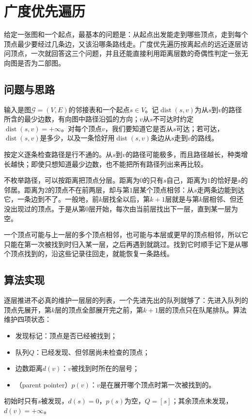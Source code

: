 \section{广度优先遍历}
\label{sec:graph-bfs}

给定一张图和一个起点，最基本的问题是：从起点出发能走到哪些顶点，走到每个顶点最少要经过几条边，又该沿哪条路线走。广度优先遍历按离起点的远近逐层访问顶点，一次就回答这三个问题，并且还能直接利用距离层数的奇偶性判定一张无向图是否为二部图。

\subsection{问题与思路}
\label{sec:graph-trav-bfs-problem}

输入是图$\mathcal G=(V,E)$的邻接表和一个起点$s\in V$。记$\operatorname{dist}(s,v)$为从$s$到$v$的路径所含的最少边数，有向图中路径沿弧的方向；$v$从$s$不可达时约定$\operatorname{dist}(s,v)=+\infty$。对每个顶点$v$，我们要知道它是否从$s$可达；若可达，$\operatorname{dist}(s,v)$是多少，以及一条恰好用$\operatorname{dist}(s,v)$条边从$s$走到$v$的路线。

按定义逐条检查路径是行不通的。从$s$到$v$的路径可能极多，而且路径越长，种类增长越快；即使只想知道最少边数，也不能把所有路径列出来再比较。

不枚举路径，可以按距离把顶点分层。距离为$0$的只有$s$自己，距离为$1$的恰好是$s$的邻居。距离为$2$的顶点不在前两层，却与第$1$层某个顶点相邻：从$s$走两条边能到达它，一条边到不了。一般地，前$k$层找全以后，第$k+1$层就是与第$k$层相邻、但还没出现过的顶点。于是从第$0$层开始，每次由当前层找出下一层，直到某一层为空。

一个顶点可能与上一层的多个顶点相邻，也可能与本层或更早的顶点相邻，所以它只能在第一次被找到时归入某一层，之后再遇到就跳过。找到它时顺手记下是从哪个顶点找到的，沿这些记录往回走，就能恢复一条路线。

\subsection{算法实现}
\label{sec:graph-trav-bfs-algorithm}

逐层推进不必真的维护一层层的列表，一个先进先出的队列就够了：先进入队列的顶点先展开，第$k$层的顶点全部展开完之前，第$k+1$层的顶点只在队尾排队。算法维护四项状态：
\begin{itemize}
  \item 发现标记：顶点是否已经被找到；
  \item 队列$Q$：已经发现、但邻居尚未检查的顶点；
  \item 边数距离$d(v)$：$v$被找到时所在的层号；
  \item {}（parent pointer）$p(v)$：$v$是在展开哪个顶点时第一次被找到的。
\end{itemize}
初始时只有$s$被发现，$d(s)=0$，$p(s)$为空，$Q=[s]$；其余顶点未发现，$d(v)=+\infty$。

